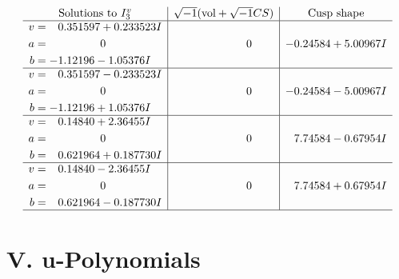 \documentclass[1p]{elsarticle_modified}
\theoremstyle{definition}
\newcommand{\I}{\sqrt{-1}}
\begin{document}
$$\begin{array}{c|c|c}  
\text{Solutions to }I^v_{3}& \I (\text{vol} + \sqrt{-1}CS) & \text{Cusp shape}\\
 \hline 
\begin{aligned}
v &= \phantom{-}0.351597 + 0.233523 I \\
a &= \phantom{-0.000000 } 0 \\
b &= -1.12196 - 1.05376 I\end{aligned}
 & \phantom{-0.000000 } 0 & -0.24584 + 5.00967 I \\ \hline\begin{aligned}
v &= \phantom{-}0.351597 - 0.233523 I \\
a &= \phantom{-0.000000 } 0 \\
b &= -1.12196 + 1.05376 I\end{aligned}
 & \phantom{-0.000000 } 0 & -0.24584 - 5.00967 I \\ \hline\begin{aligned}
v &= \phantom{-}0.14840 + 2.36455 I \\
a &= \phantom{-0.000000 } 0 \\
b &= \phantom{-}0.621964 + 0.187730 I\end{aligned}
 & \phantom{-0.000000 } 0 & \phantom{-}7.74584 - 0.67954 I \\ \hline\begin{aligned}
v &= \phantom{-}0.14840 - 2.36455 I \\
a &= \phantom{-0.000000 } 0 \\
b &= \phantom{-}0.621964 - 0.187730 I\end{aligned}
 & \phantom{-0.000000 } 0 & \phantom{-}7.74584 + 0.67954 I\\
 \hline 
 \end{array}$$\newpage
\newpage\renewcommand{\arraystretch}{1}
\centering \section*{ V. u-Polynomials}
\end{document}
